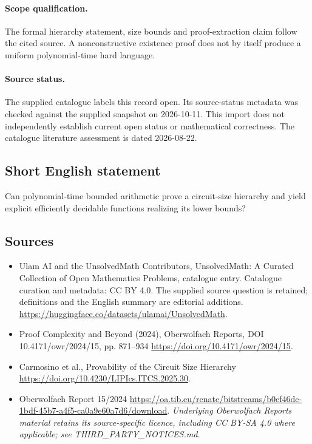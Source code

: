 \documentclass[11pt]{article}
\begin{document}
\paragraph{Scope qualification.}
The formal hierarchy statement, size bounds and proof-extraction claim follow the cited source. A nonconstructive existence proof does not by itself produce a uniform polynomial-time hard language.
\paragraph{Source status.}
The supplied catalogue labels this record open. Its source-status metadata was checked against the supplied snapshot on 2026-10-11. This import does not independently establish current open status or mathematical correctness. The catalogue literature assessment is dated 2026-08-22.
\subsection{Short English statement}
Can polynomial-time bounded arithmetic prove a circuit-size hierarchy and yield explicit efficiently decidable functions realizing its lower bounds?
\subsection{Sources}
\begin{itemize}
\item[S1] Ulam AI and the UnsolvedMath Contributors, UnsolvedMath: A Curated Collection of Open Mathematics Problems, catalogue entry. Catalogue curation and metadata: CC BY 4.0. The supplied source question is retained; definitions and the English summary are editorial additions.
\url{https://huggingface.co/datasets/ulamai/UnsolvedMath}.
\item[S2] Proof Complexity and Beyond (2024), Oberwolfach Reports, DOI 10.4171/owr/2024/15, pp. 871--934
\url{https://doi.org/10.4171/owr/2024/15}.
\item[S3] Carmosino et al., Provability of the Circuit Size Hierarchy
\url{https://doi.org/10.4230/LIPIcs.ITCS.2025.30}.
\item[S4] Oberwolfach Report 15/2024
\url{https://oa.tib.eu/renate/bitstreams/b0ef46dc-1bdf-45b7-a4f5-ca0a9e60a7d6/download}.
\textit{Underlying Oberwolfach Reports material retains its source-specific licence, including CC BY-SA 4.0 where applicable; see THIRD\_PARTY\_NOTICES.md.}
\end{itemize}
\end{document}
